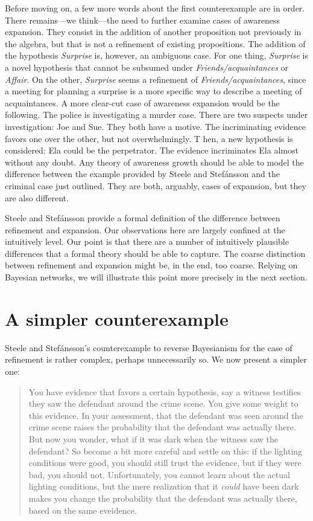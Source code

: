 \documentclass[
  11pt,
  dvipsnames,enabledeprecatedfontcommands]{scrartcl}
\begin{document}
Before moving on, a few more words about the first counterexample are in
order. There remains---we think---the need to further examine cases of
awareness expansion. They consist in the addition of another proposition
not previously in the algebra, but that is not a refinement of existing
propositions. The addition of the hypothesis \textit{Surprise} is,
however, an ambiguous case. For one thing, \textit{Surprise} is a novel
hypothesis that cannot be subsumed under \textit{Friends/acquaintances}
or \textit{Affair}. On the other, \textit{Surprise} seems a refinement
of \textit{Friends/acquaintances}, since a meeting for planning a
surprise is a more specific way to describe a meeting of acquaintances.
A more clear-cut case of awareness expansion would be the following. The
police is investigating a murder case. There are two suspects under
investigation: Joe and Sue. They both have a motive. The incriminating
evidence favors one over the other, but not overwhelmingly. T hen, a new
hypothesis is considered: Ela could be the perpetrator. The evidence
incriminates Ela almost without any doubt. Any theory of awareness
growth should be able to model the difference between the example
provided by Steele and Stefánsson and the criminal case just outlined.
They are both, arguably, cases of expansion, but they are also
different.

Steele and Stefánsson provide a formal definition of the difference
between refinement and expansion. Our observations here are largely
confined at the intuitively level. Our point is that there are a number
of intuitively plausible differences that a formal theory should be able
to capture. The coarse distinction between refinement and expansion
might be, in the end, too coarse. Relying on Bayesian networks, we will
illustrate this point more precisely in the next section.

\hypertarget{a-simpler-counterexample}{%
\section{A simpler counterexample}\label{a-simpler-counterexample}}

Steele and Stefánsson's counterexample to reverse Bayesianism for the
case of refinement is rather complex, perhaps unnecessarily so. We now
present a simpler one:

\begin{quote}
You have evidence that favors a certain hypothesis, say a witness
testifies they saw the defendant around the crime scene. You give some
weight to this evidence. In your assessment, that the defendant was seen
around the crime scene raises the probability that the defendant was
actually there. But now you wonder, what if it was dark when the witness
saw the defendant? So become a bit more careful and settle on this: if
the lighting conditions were good, you should still trust the evidence,
but if they were bad, you should not. Unfortunately, you cannot learn
about the actual lighting conditions, but the mere realization that it
\textit{could} have been dark makes you change the probability that the
defendant was actually there, based on the same eveidence.
\end{quote}
\end{document}
